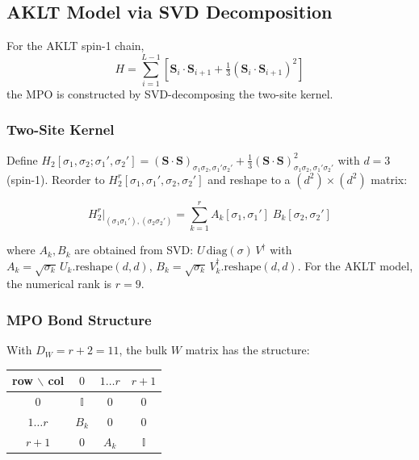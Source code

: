 \documentclass[aps,prb,onecolumn,scriptaddress]{revtex4-2}
\newcommand{\Id}{\mathbb{I}}
\begin{document}
	\subsection{AKLT Model via SVD Decomposition}
	\label{sec:aklt_mpo}
	
	For the AKLT spin-1 chain,
	\begin{equation}
		H = \sum_{i=1}^{L-1} \left[
		\bm{S}_i \cdot \bm{S}_{i+1}
		+ \tfrac{1}{3}\left(\bm{S}_i \cdot \bm{S}_{i+1}\right)^2
		\right]
	\end{equation}
	the MPO is constructed by SVD-decomposing the two-site kernel.
	
	\subsubsection{Two-Site Kernel}
	
	Define $H_2[\sigma_1,\sigma_2;\sigma_1',\sigma_2']
	= (\bm{S}\cdot\bm{S})_{\sigma_1\sigma_2,\sigma_1'\sigma_2'}
	+ \tfrac{1}{3}(\bm{S}\cdot\bm{S})^2_{\sigma_1\sigma_2,\sigma_1'\sigma_2'}$
	with $d=3$ (spin-1).
	Reorder to $H_2^r[\sigma_1,\sigma_1',\sigma_2,\sigma_2']$ and reshape to
	a $(d^2)\times(d^2)$ matrix:
	
	\begin{equation}
		H_2^r\big|_{(\sigma_1\sigma_1'),(\sigma_2\sigma_2')}
		= \sum_{k=1}^{r} A_k[\sigma_1,\sigma_1']\; B_k[\sigma_2,\sigma_2']
	\end{equation}
	
	where $A_k, B_k$ are obtained from SVD:
	$U\,\mathrm{diag}(\sigma)\,V^\dagger$ with
	$A_k = \sqrt{\sigma_k}\,U_k.\text{reshape}(d,d)$,
	$B_k = \sqrt{\sigma_k}\,V^\dagger_k.\text{reshape}(d,d)$.
	For the AKLT model, the numerical rank is $r = 9$.
	
	\subsubsection{MPO Bond Structure}
	
	With $D_W = r+2 = 11$, the bulk $W$ matrix has the structure:
	
	\begin{center}
		\begin{tabular}{c|ccc}
			\toprule
			row $\backslash$ col & $0$ & $1\ldots r$ & $r+1$ \\
			\midrule
			$0$     & $\Id$    & $0$     & $0$  \\
			$1\ldots r$ & $B_k$ & $0$     & $0$  \\
			$r+1$   & $0$      & $A_k$   & $\Id$ \\
			\bottomrule
		\end{tabular}
	\end{center}
	
\end{document}
